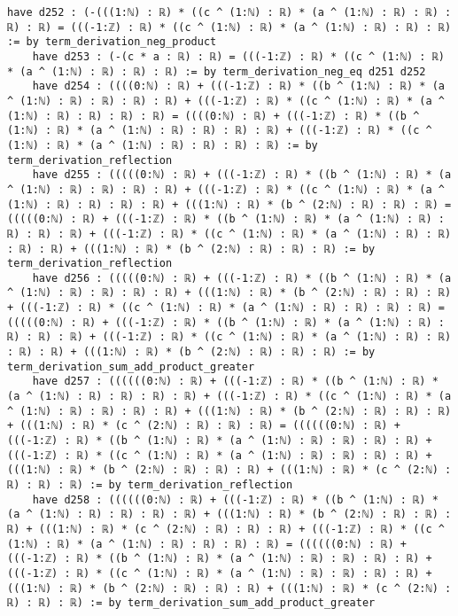 \documentclass{article}
\begin{document}
\begin{tcolorbox}[colback=white!10, width=\linewidth]
\begin{lstlisting}[language=Lean4]
    have d252 : (-(((1:ℕ) : ℝ) * ((c ^ (1:ℕ) : ℝ) * (a ^ (1:ℕ) : ℝ) : ℝ) : ℝ) : ℝ) = (((-1:ℤ) : ℝ) * ((c ^ (1:ℕ) : ℝ) * (a ^ (1:ℕ) : ℝ) : ℝ) : ℝ) := by term_derivation_neg_product
    have d253 : (-(c * a : ℝ) : ℝ) = (((-1:ℤ) : ℝ) * ((c ^ (1:ℕ) : ℝ) * (a ^ (1:ℕ) : ℝ) : ℝ) : ℝ) := by term_derivation_neg_eq d251 d252
    have d254 : ((((0:ℕ) : ℝ) + (((-1:ℤ) : ℝ) * ((b ^ (1:ℕ) : ℝ) * (a ^ (1:ℕ) : ℝ) : ℝ) : ℝ) : ℝ) + (((-1:ℤ) : ℝ) * ((c ^ (1:ℕ) : ℝ) * (a ^ (1:ℕ) : ℝ) : ℝ) : ℝ) : ℝ) = ((((0:ℕ) : ℝ) + (((-1:ℤ) : ℝ) * ((b ^ (1:ℕ) : ℝ) * (a ^ (1:ℕ) : ℝ) : ℝ) : ℝ) : ℝ) + (((-1:ℤ) : ℝ) * ((c ^ (1:ℕ) : ℝ) * (a ^ (1:ℕ) : ℝ) : ℝ) : ℝ) : ℝ) := by term_derivation_reflection
    have d255 : (((((0:ℕ) : ℝ) + (((-1:ℤ) : ℝ) * ((b ^ (1:ℕ) : ℝ) * (a ^ (1:ℕ) : ℝ) : ℝ) : ℝ) : ℝ) + (((-1:ℤ) : ℝ) * ((c ^ (1:ℕ) : ℝ) * (a ^ (1:ℕ) : ℝ) : ℝ) : ℝ) : ℝ) + (((1:ℕ) : ℝ) * (b ^ (2:ℕ) : ℝ) : ℝ) : ℝ) = (((((0:ℕ) : ℝ) + (((-1:ℤ) : ℝ) * ((b ^ (1:ℕ) : ℝ) * (a ^ (1:ℕ) : ℝ) : ℝ) : ℝ) : ℝ) + (((-1:ℤ) : ℝ) * ((c ^ (1:ℕ) : ℝ) * (a ^ (1:ℕ) : ℝ) : ℝ) : ℝ) : ℝ) + (((1:ℕ) : ℝ) * (b ^ (2:ℕ) : ℝ) : ℝ) : ℝ) := by term_derivation_reflection
    have d256 : (((((0:ℕ) : ℝ) + (((-1:ℤ) : ℝ) * ((b ^ (1:ℕ) : ℝ) * (a ^ (1:ℕ) : ℝ) : ℝ) : ℝ) : ℝ) + (((1:ℕ) : ℝ) * (b ^ (2:ℕ) : ℝ) : ℝ) : ℝ) + (((-1:ℤ) : ℝ) * ((c ^ (1:ℕ) : ℝ) * (a ^ (1:ℕ) : ℝ) : ℝ) : ℝ) : ℝ) = (((((0:ℕ) : ℝ) + (((-1:ℤ) : ℝ) * ((b ^ (1:ℕ) : ℝ) * (a ^ (1:ℕ) : ℝ) : ℝ) : ℝ) : ℝ) + (((-1:ℤ) : ℝ) * ((c ^ (1:ℕ) : ℝ) * (a ^ (1:ℕ) : ℝ) : ℝ) : ℝ) : ℝ) + (((1:ℕ) : ℝ) * (b ^ (2:ℕ) : ℝ) : ℝ) : ℝ) := by term_derivation_sum_add_product_greater
    have d257 : ((((((0:ℕ) : ℝ) + (((-1:ℤ) : ℝ) * ((b ^ (1:ℕ) : ℝ) * (a ^ (1:ℕ) : ℝ) : ℝ) : ℝ) : ℝ) + (((-1:ℤ) : ℝ) * ((c ^ (1:ℕ) : ℝ) * (a ^ (1:ℕ) : ℝ) : ℝ) : ℝ) : ℝ) + (((1:ℕ) : ℝ) * (b ^ (2:ℕ) : ℝ) : ℝ) : ℝ) + (((1:ℕ) : ℝ) * (c ^ (2:ℕ) : ℝ) : ℝ) : ℝ) = ((((((0:ℕ) : ℝ) + (((-1:ℤ) : ℝ) * ((b ^ (1:ℕ) : ℝ) * (a ^ (1:ℕ) : ℝ) : ℝ) : ℝ) : ℝ) + (((-1:ℤ) : ℝ) * ((c ^ (1:ℕ) : ℝ) * (a ^ (1:ℕ) : ℝ) : ℝ) : ℝ) : ℝ) + (((1:ℕ) : ℝ) * (b ^ (2:ℕ) : ℝ) : ℝ) : ℝ) + (((1:ℕ) : ℝ) * (c ^ (2:ℕ) : ℝ) : ℝ) : ℝ) := by term_derivation_reflection
    have d258 : ((((((0:ℕ) : ℝ) + (((-1:ℤ) : ℝ) * ((b ^ (1:ℕ) : ℝ) * (a ^ (1:ℕ) : ℝ) : ℝ) : ℝ) : ℝ) + (((1:ℕ) : ℝ) * (b ^ (2:ℕ) : ℝ) : ℝ) : ℝ) + (((1:ℕ) : ℝ) * (c ^ (2:ℕ) : ℝ) : ℝ) : ℝ) + (((-1:ℤ) : ℝ) * ((c ^ (1:ℕ) : ℝ) * (a ^ (1:ℕ) : ℝ) : ℝ) : ℝ) : ℝ) = ((((((0:ℕ) : ℝ) + (((-1:ℤ) : ℝ) * ((b ^ (1:ℕ) : ℝ) * (a ^ (1:ℕ) : ℝ) : ℝ) : ℝ) : ℝ) + (((-1:ℤ) : ℝ) * ((c ^ (1:ℕ) : ℝ) * (a ^ (1:ℕ) : ℝ) : ℝ) : ℝ) : ℝ) + (((1:ℕ) : ℝ) * (b ^ (2:ℕ) : ℝ) : ℝ) : ℝ) + (((1:ℕ) : ℝ) * (c ^ (2:ℕ) : ℝ) : ℝ) : ℝ) := by term_derivation_sum_add_product_greater

\end{lstlisting}
\end{tcolorbox}
\end{document}
